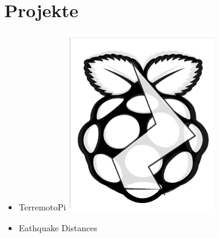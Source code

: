 \documentclass{article}
\begin{document}
\begin{minipage}[t]{0.67\textwidth}
		\section*{\fontsize{18pt}{24pt}\selectfont \color{pblue} Projekte}
		\begin{itemize}
		\item TerremotoPi \href{https://github.com/silvioschwarz/TerremotoPi}{\includegraphics[scale=0.05]{../img/terremotoPiIcon.png}}
		\item Eathquake Distances \href{https://github.com/silvioschwarz/Earthquake-Distances}{\faGithub}
		\end{itemize}
\end{minipage}
\end{document}
